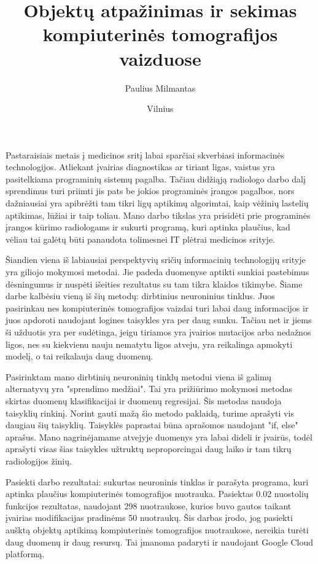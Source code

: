 \documentclass{VUMIFInfKursinis}
\title{Objektų atpažinimas ir sekimas kompiuterinės tomografijos vaizduose}
\author{Paulius Milmantas}
\date{Vilnius \\ \the\year}
\begin{document}
\maketitle

Pastaraisiais metais į medicinos sritį labai sparčiai skverbiasi informacinės technologijos. Atliekant
įvairias diagnostikas ar tiriant ligas, vaistus yra pasitelkiama programinių sistemų pagalba. Tačiau
didžiąją radiologo darbo dalį sprendimus turi priimti jis pats be jokios programinės įrangos pagalbos,
nors dažniausiai yra apibrėžti tam tikri ligų aptikimų algorimtai, kaip vėžinių lastelių aptikimas,
lūžiai ir taip toliau. Mano darbo tikslas yra prisidėti prie programinės įrangos kūrimo radiologams
ir sukurti programą, kuri aptinka plaučius, kad vėliau tai galėtų būti panaudota tolimesnei
IT plėtrai medicinos srityje.
\par
Šiandien viena iš labiausiai perspektyvių sričių informacinių technologijų srityje yra giliojo mokymosi
metodai.
Jie padeda duomenyse aptikti sunkiai pastebimus dėsningumus ir nuspėti išeities rezultatus su tam tikra klaidos tikimybe.
Šiame darbe kalbėsiu vieną iš šių metodų: dirbtinius neuroninius tinklus.
Juos pasirinkau nes kompiuterinės tomografijos vaizdai turi labai daug informacijos ir juos apdoroti
naudojant logines taisykles yra per daug sunku. Tačiau net ir jiems ši užduotis yra per sudėtinga, jeigu
tiriamos yra įvairios mutacijos arba nedažnos ligos, nes su kiekvienu nauju nematytu ligos atveju,
yra reikalinga apmokyti modelį, o tai reikalauja daug duomenų.
\par
Pasirinktam mano dirbtinių neuroninių tinklų metodui viena iš galimų alternatyvų yra "sprendimo medžiai".
Tai yra prižiūrimo mokymosi metodas skirtas duomenų klasifikacijai ir duomenų regresijai. Šis metodas
naudoja taisyklių rinkinį. Norint gauti mažą šio metodo paklaidą, turime aprašyti vis daugiau šių taisyklių.
Taisyklės paprastai būna aprašomos naudojant "if, else" aprašus.\cite{salt1} Mano nagrinėjamame atvejyje duomenys
yra labai dideli ir įvairūs, todėl aprašyti visas šias taisykles užtruktų neproporcingai daug laiko ir tam
tikrų radiologijos žinių.
\par
Pasiekti darbo rezultatai: sukurtas neuroninis tinklas ir parašyta programa, kuri aptinka plaučius kompiuterinės tomografijos
nuotrauka. Pasiektas 0.02 nuostolių funkcijos rezultatas, naudojant 298 nuotraukose, kurios buvo gautos taikant
įvairias modifikacijas pradinėms 50 nuotraukų. Šis darbas įrodo, jog pasiekti aušktą
objektų aptikimą kompiuterinės tomografijos nuotraukose, nereikia turėti daug duomenų ir daug
resursų. Tai įmanoma padaryti ir naudojant Google Cloud platformą.
\end{document}
